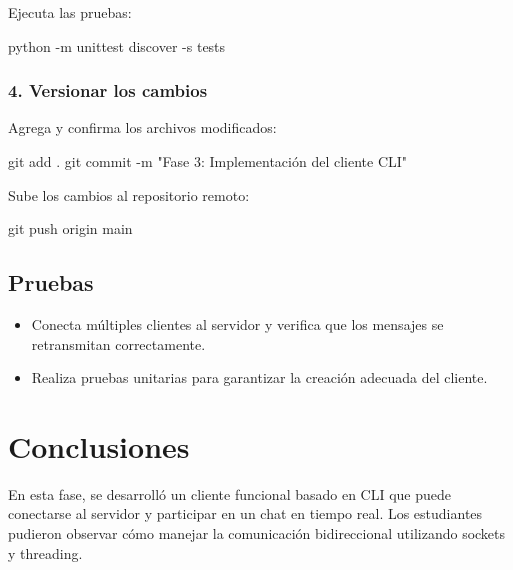 \documentclass[
  a4paper,
  DIV=11,
  numbers=noendperiod,
  onepage,
  openany]{scrreprt}
\newenvironment{Shaded}{\begin{snugshade}}{\end{snugshade}}
\newcommand{\AttributeTok}[1]{\textcolor[rgb]{0.40,0.45,0.13}{#1}}
\newcommand{\ExtensionTok}[1]{\textcolor[rgb]{0.00,0.23,0.31}{#1}}
\newcommand{\FunctionTok}[1]{\textcolor[rgb]{0.28,0.35,0.67}{#1}}
\newcommand{\NormalTok}[1]{\textcolor[rgb]{0.00,0.23,0.31}{#1}}
\newcommand{\StringTok}[1]{\textcolor[rgb]{0.13,0.47,0.30}{#1}}
\providecommand{\tightlist}{%
  \setlength{\itemsep}{0pt}\setlength{\parskip}{0pt}}\usepackage{longtable,booktabs,array}
\begin{document}
Ejecuta las pruebas:

\begin{Shaded}
\begin{Highlighting}[]
\ExtensionTok{python} \AttributeTok{{-}m}\NormalTok{ unittest discover }\AttributeTok{{-}s}\NormalTok{ tests}
\end{Highlighting}
\end{Shaded}

\subsection{4. Versionar los cambios}\label{versionar-los-cambios-1}

Agrega y confirma los archivos modificados:

\begin{Shaded}
\begin{Highlighting}[]
\FunctionTok{git}\NormalTok{ add .}
\FunctionTok{git}\NormalTok{ commit }\AttributeTok{{-}m} \StringTok{"Fase 3: Implementación del cliente CLI"}
\end{Highlighting}
\end{Shaded}

Sube los cambios al repositorio remoto:

\begin{Shaded}
\begin{Highlighting}[]
\FunctionTok{git}\NormalTok{ push origin main}
\end{Highlighting}
\end{Shaded}

\section{Pruebas}\label{pruebas-2}

\begin{itemize}
\tightlist
\item
  Conecta múltiples clientes al servidor y verifica que los mensajes se
  retransmitan correctamente.
\item
  Realiza pruebas unitarias para garantizar la creación adecuada del
  cliente.
\end{itemize}

\chapter{Conclusiones}\label{conclusiones-15}

En esta fase, se desarrolló un cliente funcional basado en CLI que puede
conectarse al servidor y participar en un chat en tiempo real. Los
estudiantes pudieron observar cómo manejar la comunicación bidireccional
utilizando sockets y threading.
\end{document}
